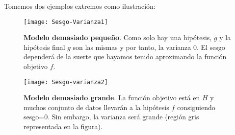 Tomemos dos ejemplos extremos como ilustración:
\begin{figure}
\centering
\begin{minipage}{.5\textwidth}
  \centering
  \texttt{[image: Sesgo-Varianza1]}
  \caption{\textbf{Modelo demasiado pequeño}. Como solo hay una hipótesis, $\bar{g}$ y la hipótesis final $g$ son las mismas y por tanto, la varianza 0. El sesgo dependerá de la suerte que hayamos tenido aproximando la función objetivo $f$. \cite{abu2012learning}}
  \label{fig:s-v1}
\end{minipage}%
\hfill
\begin{minipage}{.4\textwidth}
  \centering
  \texttt{[image: Sesgo-varianza2]}
  \caption{\textbf{Modelo demasiado grande}. La función objetivo está en $H$ y muchos conjunto de datos llevarán a la hipótesis $f$ consiguiendo sesgo=0. Sin embargo, la varianza será grande (región gris representada en la figura). \cite{abu2012learning}}
  \label{fig:s-v2}
\end{minipage}
\end{figure}
